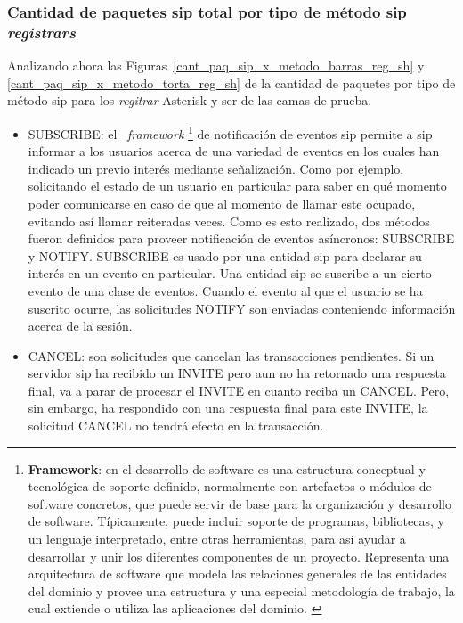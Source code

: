 \documentclass[a4paper,12pt]{report}
\begin{document}
{\subsubsection{Cantidad de paquetes \ac{sip} total por tipo de método \ac{sip} \emph{registrars}}
Analizando ahora las Figuras~\ref{cant_paq_sip_x_metodo_barras_reg_sh} y
\ref{cant_paq_sip_x_metodo_torta_reg_sh} de la cantidad de
paquetes por tipo de método \ac{sip} para los \emph{regitrar} Asterisk y \ac{ser}
de las camas de prueba.\\ 

\begin{itemize}
\item SUBSCRIBE: el \ \emph{framework} \footnote{\textbf{Framework}: en el de\-sa\-rro\-llo
de software es una estructura conceptual y tecnológica de soporte definido, normalmente con
artefactos o módulos de software concretos, que puede servir de base para la
organización y de\-sa\-rro\-llo de software. Típicamente, puede incluir soporte de
programas, bibliotecas, y un lenguaje interpretado, entre otras herramientas,
para así ayudar a desarrollar y unir los diferentes componentes de un
proyecto. Representa una arquitectura de software que modela las relaciones
generales de las entidades del dominio y provee una estructura y una especial
metodología de trabajo, la cual extiende o utiliza las aplicaciones del
dominio. \cite{riehle}} de notificación de eventos \ac{sip}
permite a \ac{sip} informar a los usuarios acerca de una variedad de eventos en los
cuales han indicado un previo interés mediante señalización. Como por ejemplo,
solicitando el estado de un usuario en particular para saber en qué momento
poder comunicarse en caso de que al momento de llamar este ocupado, evitando así
llamar reiteradas veces. Como es esto realizado, dos métodos fueron definidos
para proveer notificación de eventos asíncronos: SUBSCRIBE y NOTIFY.
SUBSCRIBE es usado por una entidad \ac{sip} para declarar su interés en un evento en
particular. Una entidad \ac{sip} se suscribe a un cierto evento de una clase de
eventos. Cuando el evento al que el usuario se ha suscrito ocurre, las
solicitudes NOTIFY son enviadas conteniendo información acerca de la sesión. 

\item CANCEL: son solicitudes que cancelan las transacciones pendientes.
Si un servidor \ac{sip} ha recibido un INVITE pero aun no ha retornado una
respuesta final, va a parar de procesar el INVITE en cuanto reciba un CANCEL.
Pero, sin embargo, ha respondido con una respuesta final para este INVITE, la
solicitud CANCEL no tendrá efecto en la transacción. 


\end{itemize}}
\end{document}
